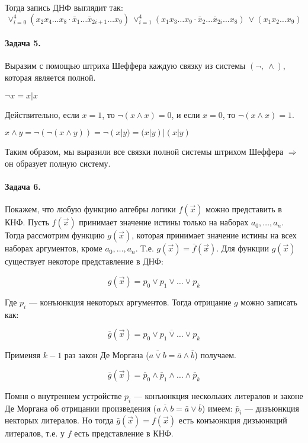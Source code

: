 \documentclass{article}
\begin{document}
    Тогда запись ДНФ выглядит так:
    $$ \vee_{i=0}^{4} (x_2x_4\ldots x_8 \cdot \bar{x}_1 \ldots \bar{x}_{2i + 1} \ldots x_9)\  \vee_{i=1}^{4} (x_1x_3\ldots x_9 \cdot \bar{x}_2 \ldots \bar{x}_{2i} \ldots x_8)\ \vee (x_1x_2\ldots x_9)$$
     \paragraph{Задача 5.}
     Выразим с помощью штриха Шеффера каждую связку из системы $(\neg,\ \wedge)$, которая является полной.

     $\neg x = x | x$

     Действительно, если $x = 1$, то $\neg (x \wedge x) = 0$, и если $x = 0$, то $\neg (x\wedge x) =1$.

     $x \wedge y = \neg(\neg(x \wedge y)) = \neg(x | y) = (x | y) | (x | y)$

     Таким образом, мы выразили все связки полной системы штрихом Шеффера $\Rightarrow$ он образует полную систему.
     
     \paragraph{Задача 6.}
     Покажем, что любую функцию алгебры логики $f(\vec{x})$ можно представить в КНФ.
     Пусть $f(\vec{x})$ принимает значение истины только на наборах $a_0, \ldots, a_n$. Тогда рассмотрим функцию $g(\vec{x  })$, которая принимает значение истины на всех наборах аргументов, кроме $a_0, \ldots, a_n$. Т.е. $g(\vec{x}) = \bar{f}(\vec{x})$. Для функции $g(\vec{x})$ существует некоторе представление в ДНФ:
     
          $$ g(\vec{x}) = p_0 \vee p_1 \vee \ldots \vee p_k $$

    Где $p_i$ --- конъюнкция некоторых аргументов. Тогда отрицание $g$ можно записать как:

          $$ \bar{g}(\vec{x}) = \overline{p_0 \vee p_1 \vee \ldots \vee p_k} $$

    Применяя $k - 1$ раз закон Де Моргана ($\overline{a \vee b} = \bar{a} \wedge \bar{b} $) получаем.

        $$ \bar{g}(\vec{x}) = \bar{p}_0 \wedge \bar{p}_1 \wedge \ldots \wedge \bar{p}_k $$

    Помня о внутреннем устройстве $p_i$ --- конъюнкция нескольких литералов и законе Де Моргана об отрицании произведения ($\overline{a \wedge b} = \bar{a} \vee \bar{b} $) имеем: $\bar{p}_i$ --- дизъюнкция некторых литералов.
    Но тогда $\bar{g}(\vec{x}) = f(\vec{x})$ есть конъюнкция дизъюнкций литералов, т.е. у $f$ есть представление в КНФ.
\end{document}
